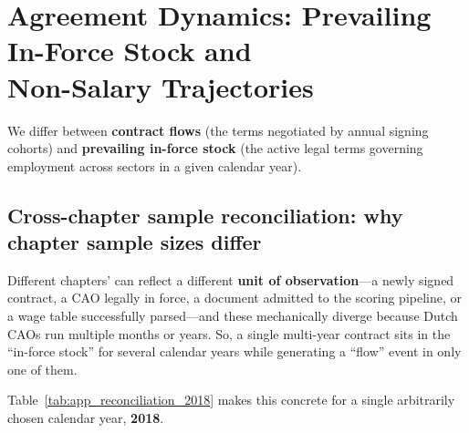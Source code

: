 \section[Agreement Dynamics: Prevailing In-Force Stock and Non-Salary Trajectories]{Agreement Dynamics: Prevailing In-Force Stock and\\ Non-Salary Trajectories}
\label{app:latest_cao_view}
\label{app:non_salary_robustness}

We differ between \textbf{contract flows} (the terms negotiated by annual signing cohorts) and \textbf{prevailing in-force stock} (the active legal terms governing employment across sectors in a given calendar year). 

\subsection*{Cross-chapter sample reconciliation: why chapter sample sizes differ}

Different chapters' can reflect a different \textbf{unit of observation}---a newly signed contract, a CAO legally in force, a document admitted to the scoring pipeline, or a wage table successfully parsed---and these mechanically diverge because Dutch CAOs run multiple months or years. So, a single multi-year contract sits in the ``in-force stock'' for several calendar years while generating a ``flow'' event in only one of them.

Table~\ref{tab:app_reconciliation_2018} makes this concrete for a single arbitrarily chosen calendar year, \textbf{2018}.

